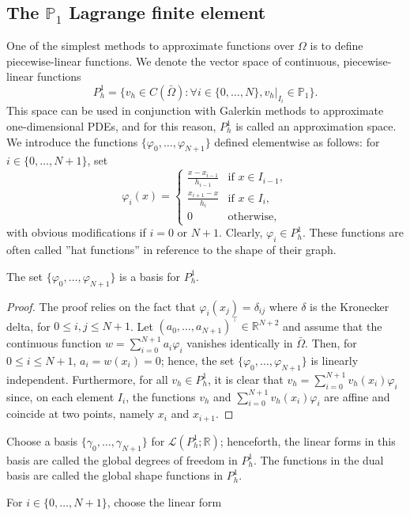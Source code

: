 \subsection{The $\mathbb{P}_1$ Lagrange finite element}
One of the simplest methods to approximate functions over $\Omega$ is to define piecewise-linear functions. We denote the vector space of continuous, piecewise-linear functions
\begin{equation*}
P_h^1 = \{ v_h \in C(\bar{\Omega}): \forall i \in \{0, \dots, N\}, v_h|_{I_i} \in \mathbb{P}_1 \}.
\end{equation*}
This space can be used in conjunction with Galerkin methods to approximate one-dimensional PDEs, and for this reason, $P_h^1$ is called an approximation space.
We introduce the functions $\{\varphi_0, \dots, \varphi_{N+1}\}$ defined elementwise as follows: for $i \in \{0, \dots, N+1\}$, set
\begin{equation*}
\varphi_i(x) = \begin{cases} \frac{x - x_{i-1}}{h_{i-1}} & \text{if } x \in I_{i-1}, \\ \frac{x_{i+1} - x}{h_i} & \text{if } x \in I_i, \\ 0 & \text{otherwise}, \end{cases}
\end{equation*}
with obvious modifications if $i = 0$ or $N+1$. Clearly, $\varphi_i \in P_h^1$. These functions are often called ''hat functions'' in reference to the shape of their graph.
\begin{lemma} \label{hatbasis}
    The set $\{\varphi_0, \dots, \varphi_{N+1}\}$ is a basis for $P_h^1$.
    \begin{proof}
        The proof relies on the fact that $\varphi_i(x_j) = \delta_{ij}$ where $\delta$ is the Kronecker delta, for $0 \le i,j \le N+1$. Let $(a_0, \dots, a_{N+1})^\top \in \mathbb{R}^{N+2}$ and assume that the continuous function $w = \sum_{i=0}^{N+1} a_i \varphi_i$ vanishes identically in $\bar{\Omega}$. Then, for $0 \le i \le N+1$, $a_i = w(x_i) = 0$; hence, the set $\{\varphi_0, \dots, \varphi_{N+1}\}$ is linearly independent. Furthermore, for all $v_h \in P_h^1$, it is clear that $v_h = \sum_{i=0}^{N+1} v_h(x_i) \varphi_i$ since, on each element $I_i$, the functions $v_h$ and $\sum_{i=0}^{N+1} v_h(x_i) \varphi_i$ are affine and coincide at two points, namely $x_i$ and $x_{i+1}$.
    \end{proof}
\end{lemma}
\begin{definition}
    Choose a basis $\{\gamma_0, \dots, \gamma_{N+1}\}$ for $\mathcal{L}(P_h^1;\mathbb{R})$; henceforth, the linear forms in this basis are called the global degrees of freedom in $P_h^1$. The functions in the dual basis are called the global shape functions in $P_h^1$. 
\end{definition}
For $i \in \{0, \dots, N+1\}$, choose the linear form

